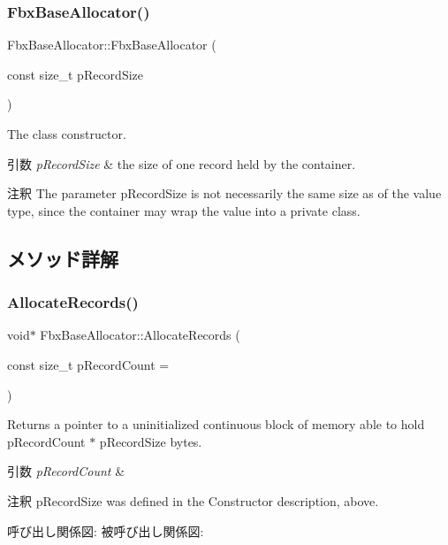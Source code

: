 \subsubsection{\texorpdfstring{Fbx\+Base\+Allocator()}{FbxBaseAllocator()}}
{\footnotesize\ttfamily Fbx\+Base\+Allocator\+::\+Fbx\+Base\+Allocator (\begin{DoxyParamCaption}\item[{const size\+\_\+t}]{p\+Record\+Size }\end{DoxyParamCaption})}

The class constructor. 
\begin{DoxyParams}{引数}
{\em p\+Record\+Size} & the size of one record held by the container. \\
\hline
\end{DoxyParams}
\begin{DoxyRemark}{注釈}
The parameter p\+Record\+Size is not necessarily the same size as of the value type, since the container may wrap the value into a private class. 
\end{DoxyRemark}


\subsection{メソッド詳解}
\mbox{\label{class_fbx_base_allocator_a3701773862fa1a808aaff72a3b541d8f}} 
\subsubsection{\texorpdfstring{Allocate\+Records()}{AllocateRecords()}}
{\footnotesize\ttfamily void$\ast$ Fbx\+Base\+Allocator\+::\+Allocate\+Records (\begin{DoxyParamCaption}\item[{const size\+\_\+t}]{p\+Record\+Count = {} }\end{DoxyParamCaption})}

Returns a pointer to a uninitialized continuous block of memory able to hold p\+Record\+Count $\ast$ p\+Record\+Size bytes. 
\begin{DoxyParams}{引数}
{\em p\+Record\+Count} & \\
\hline
\end{DoxyParams}
\begin{DoxyRemark}{注釈}
p\+Record\+Size was defined in the Constructor description, above. 
\end{DoxyRemark}
呼び出し関係図\+:
被呼び出し関係図\+:
\mbox{\label{class_fbx_base_allocator_a345b6d46e57e8313966a5f3654d1195c}} 
